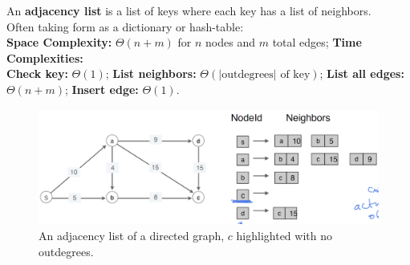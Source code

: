 \newpage
\begin{Def}

    An \textbf{adjacency list} is a list of keys where each key has a list of neighbors.\\

    \noindent
    Often taking form as a dictionary or hash-table:\\
    \textbf{Space Complexity:} $\Theta (n+m)$ for $n$ nodes and $m$ total edges; \textbf{Time Complexities:}\\
    \textbf{Check key:} $\Theta (1)$; \textbf{List neighbors:} $\Theta(\text{|outdegrees| of key})$; \textbf{List all edges:} $\Theta(n+m)$;
    \textbf{Insert edge:} $\Theta(1)$.
\end{Def}

\begin{figure}[h]
  \begin{center}
    \includegraphics[height=1.5in]{./Sections/graphs/adj_list.png}
  \end{center}
   \caption{An adjacency list of a directed graph, $c$ highlighted with no outdegrees.}\label{fig:adj_list}
\end{figure}






